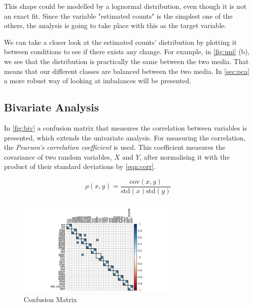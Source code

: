 \documentclass[11pt,twoside]{article}
\numberwithin{Theorem}{section}
\numberwithin{Definition}{section}
\numberwithin{Lemma}{section}
\numberwithin{Algorithm}{section}
\numberwithin{equation}{section}
\begin{document}
This shape could be modelled by a lognormal distribution, even though it is not an exact fit. Since the variable "estimated counts" is the simplest one of the others, the analysis is going to take place with this as the target variable. 

We can take a closer look at the estimated counts' distribution by plotting it between conditions to see if there exists any change. For example, in \autoref{fig:uni} (b), we see that the distribution is practically the same between the two media. That means that our different classes are balanced between the two media. In \autoref{sec:pca} a more robust way of looking at imbalances will be presented. 

\subsection{Bivariate Analysis}
\label{sec:bivariate}

In \autoref{fig:biv} a confusion matrix that measures the correlation between variables is presented, which extends the univariate analysis. For measuring the correlation, the \textit{Pearson's correlation coefficient} is used. This coefficient measures the covariance of two random variables, $X$ and $Y$, after normalising it with the product of their standard deviations by \autoref{eqn:corr}.

\begin{equation}
\label{eqn:corr}
\rho(x,y) = \frac{\text{cov}(x,y)}{\text{std}(x)\text{std}(y)}
\end{equation}


\vspace*{1em}
\begin{figure}[]
\centering
\includegraphics[width=0.7\textwidth]{./output/bivariate-analysis.pdf}
\caption{Confusion Matrix}
\label{fig:biv}
\end{figure}
\vspace{2em}
\end{document}
